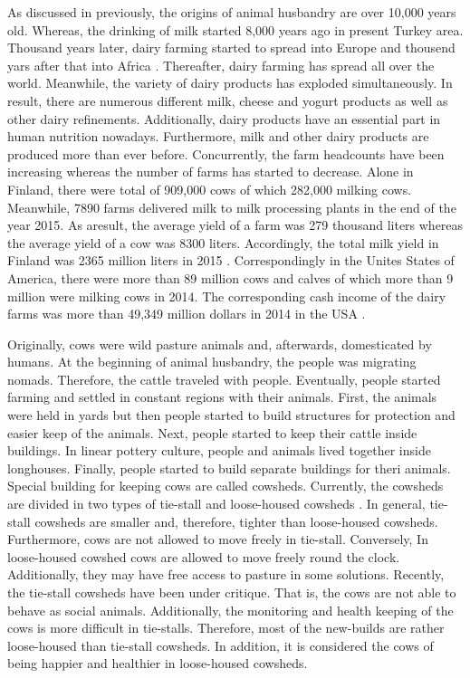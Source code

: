 \documentclass[english,12pt,a4paper,pdftex,elec,utf8]{aaltothesis}
\begin{document}
As discussed in previously, the origins of animal husbandry are over 10,000 years old. Whereas, the drinking of milk started 8,000 years ago in present Turkey area. Thousand years later, dairy farming started to spread into Europe and thousend yars after that into Africa \cite{ancienthistoryofmilk}. Thereafter, dairy farming has spread all over the world. Meanwhile, the variety of dairy products has exploded simultaneously. In result, there are numerous different milk, cheese and yogurt products as well as other dairy refinements. Additionally, dairy products have an essential part in human nutrition nowadays. Furthermore, milk and other dairy products are produced more than ever before. Concurrently, the farm headcounts have been increasing whereas the number of farms has started to decrease. Alone in Finland, there were total of 909,000 cows of which 282,000 milking cows. Meanwhile, 7890 farms delivered milk to milk processing plants in the end of the year 2015. As aresult, the average yield of a farm was 279 thousand liters whereas the average yield of a cow was 8300 liters. Accordingly, the total milk yield in Finland was 2365 million liters in 2015 \cite{ruokajaluonnonvaratilastot2016}. Correspondingly in the Unites States of America, there were more than 89 million cows and calves of which more than 9 million were milking cows in 2014. The corresponding cash income of the dairy farms was more than 49,349 million dollars in 2014 in the USA \cite{agriculturalstatistics2015}.


Originally, cows were wild pasture animals and, afterwards,  domesticated by humans. At the beginning of animal husbandry, the people was migrating nomads. Therefore, the cattle traveled with people. Eventually, people started farming and settled in constant regions with their animals. First, the animals were held in yards but then people started to build structures for protection and easier keep of the animals. Next, people started to keep their cattle inside buildings. In linear pottery culture, people and animals lived together inside longhouses. Finally, people started to build separate buildings for theri animals. Special building for keeping cows are called cowsheds. Currently, the cowsheds are divided in two types of tie-stall and loose-housed cowsheds \cite{lehmahavaintoja}. In general, tie-stall cowsheds are smaller and, therefore,  tighter than loose-housed cowsheds. Furthermore, cows are not allowed to move freely in tie-stall. Conversely, In loose-housed cowshed cows are allowed to move freely round the clock. Additionally, they may have free access to pasture in some solutions. Recently, the tie-stall cowsheds have been under critique. That is, the cows are not able to behave as social animals. Additionally, the monitoring and health keeping of the cows is more difficult in tie-stalls. Therefore, most of the new-builds are rather loose-housed than tie-stall cowsheds. In addition, it is considered the cows of being happier and healthier in loose-housed cowsheds. 
\end{document}
